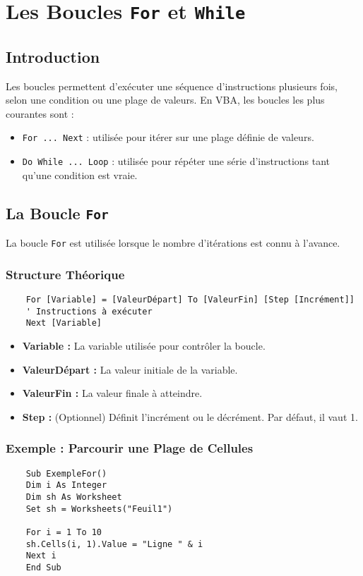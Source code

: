 \documentclass[a4paper,12pt]{report}
\begin{document}
\chapter{Les Boucles \texttt{For} et \texttt{While}}

\section{Introduction}
Les boucles permettent d'exécuter une séquence d'instructions plusieurs fois, selon une condition ou une plage de valeurs. En VBA, les boucles les plus courantes sont :
\begin{itemize}
	\item \texttt{For ... Next} : utilisée pour itérer sur une plage définie de valeurs.
	\item \texttt{Do While ... Loop} : utilisée pour répéter une série d'instructions tant qu'une condition est vraie.
\end{itemize}

\section{La Boucle \texttt{For}}
La boucle \texttt{For} est utilisée lorsque le nombre d'itérations est connu à l'avance.

\subsection*{Structure Théorique}
\begin{lstlisting}
	For [Variable] = [ValeurDépart] To [ValeurFin] [Step [Incrément]]
	' Instructions à exécuter
	Next [Variable]
\end{lstlisting}

\begin{itemize}
	\item \textbf{Variable :} La variable utilisée pour contrôler la boucle.
	\item \textbf{ValeurDépart :} La valeur initiale de la variable.
	\item \textbf{ValeurFin :} La valeur finale à atteindre.
	\item \textbf{Step :} (Optionnel) Définit l'incrément ou le décrément. Par défaut, il vaut 1.
\end{itemize}

\subsection*{Exemple : Parcourir une Plage de Cellules}
\begin{lstlisting}
	Sub ExempleFor()
	Dim i As Integer
	Dim sh As Worksheet
	Set sh = Worksheets("Feuil1")
	
	For i = 1 To 10
	sh.Cells(i, 1).Value = "Ligne " & i
	Next i
	End Sub
\end{lstlisting}
\end{document}

